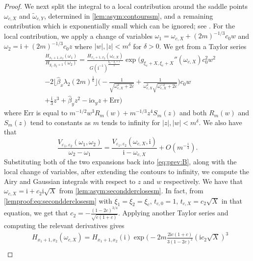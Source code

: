\documentclass[11pt,twoside]{amsart}
\theoremstyle{plain}
\numberwithin{quest}{section}
\theoremstyle{remark}
\numberwithin{rem}{section}
\theoremstyle{definition}
\newcommand{\eps}{\varepsilon}
\begin{document}
\begin{proof}
		We next split the integral to a local contribution around the saddle points $\omega_{c,X}$ and $\tilde{\omega}_{c,Y}$, determined in \eqref{lem:asym:contourssm}, and a remaining contribution which is exponentially small which can be ignored; see \cite[Proposition 3.12]{CJ16}. For the local contribution, we apply a change of variables $\omega_1=\omega_{c,X}+(2m)^{-1/3}c_0 w$ and $\omega_2=\mathrm{i}+(2m)^{-1/3}c_0 z$ where $|w|,|z|<m^{\delta}$ for $\delta>0$.  We get from a Taylor series 
		\begin{equation*}
			\begin{split}
				&\frac{H_{x_1+1,x_2}(\omega_1)}{H_{y_1,y_2+1}(\omega_2)}=\frac{H_{x_1+1,x_2}(\omega_{c,X})}{G(\mathrm{i}^{-1})^{\frac{y_2-y_1+1}{2}}}  \exp \Bigg(g_{\xi_c+X,\xi_c+X}''(\omega_{c,X}) c_0^2w^2\\
				&-2\lfloor \hat{\beta}_x \lambda_2 (2m)^{\frac{1}{6}} \rfloor  \bigg(-\frac{1}{\sqrt{\omega_{c,X}^2+2c}}+\frac{1}{\omega_{c,X}^2\sqrt{\omega_{c,X}^{-2}+2c}} \bigg)c_0w\\
				&+\frac{\mathrm{i}}{3}{z^3} +\hat{\beta}_y z^2 -\mathrm{i} \alpha_y z +\mathrm{Err}\Bigg)
			\end{split}
		\end{equation*}
		where $\mathrm{Err}$ is equal to $m^{-1/2}w^3 R_m(w)+m^{-1/3}z^4 S_m(z)$ and both $R_m(w)$ and $S_m(z)$ tend to constants as $m$ tends to infinity for $|z|,|w| < m^\delta$.   We also have that 
		\begin{equation*}
			\frac{V_{\eps_1,\eps_2}(\omega_1,\omega_2)}{\omega_2-\omega_1}=\frac{V_{\eps_1,\eps_2}(\omega_{c,X},\mathrm{i})}{\mathrm{i}-\omega_{c,X}}+O(m^{-\frac{1}{3}}).
		\end{equation*}
		Substituting both of the two expansions back into \eqref{eq:prev:B}, along with the local change of variables, after extending the contours to infinity, we compute the Airy and Gaussian integrals with respect to $z$ and $w$ respectively.     We have that $\omega_{c,X}=\mathrm{i}+c_2\mathrm{i}\sqrt{X}$ from \cref{lem:asym:secondderclosesm}. In fact, from \eqref{lemproof:eq:secondderclosesm} with $\xi_1=\xi_2=\xi_c$, $t_{c,0}=1$, $t_{c,X}=c_2\sqrt{X}$ in that equation,  we get that $c_2=-\frac{(1-2c)^{3/4}}{\sqrt{c(1+c)}}$. Applying another Taylor series and computing the relevant derivatives gives
		\begin{equation*}
			\begin{split}
				& H_{x_1+1,x_2}(\omega_{c,X})= H_{x_1+1,x_2}(\mathrm{i}) \exp \Bigg(-2m \frac{2\mathrm{i}c(1+c)}{3(1-2c)^2} (\mathrm{i} c_2 \sqrt{X})^3 \\

\end{split}
\end{equation*}
\end{proof}
\end{document}
